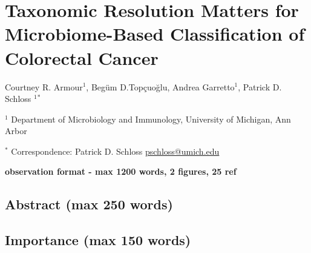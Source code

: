 \documentclass[
]{article}
\author{}
\date{\vspace{-2.5em}}
\begin{document}
\hypertarget{taxonomic-resolution-matters-for-microbiome-based-classification-of-colorectal-cancer}{%
\section{Taxonomic Resolution Matters for Microbiome-Based
Classification of Colorectal
Cancer}\label{taxonomic-resolution-matters-for-microbiome-based-classification-of-colorectal-cancer}}

\vspace{10mm}

Courtney R. Armour\({^1}\), Begüm D.Topçuoğlu, Andrea Garretto\({^1}\),
Patrick D. Schloss \({^1}\)\({^*}\)

\vspace{5mm}

\({^1}\) Department of Microbiology and Immunology, University of
Michigan, Ann Arbor

\vspace{5mm}

\({^*}\) Correspondence: Patrick D. Schloss
\href{mailto:pschloss@umich.edu}{pschloss@umich.edu}

\vspace{20mm}

\textbf{observation format - max 1200 words, 2 figures, 25 ref}

\newpage

\hypertarget{abstract-max-250-words}{%
\subsection{Abstract (max 250 words)}\label{abstract-max-250-words}}

\hypertarget{importance-max-150-words}{%
\subsection{Importance (max 150 words)}\label{importance-max-150-words}}

\newpage
\end{document}
